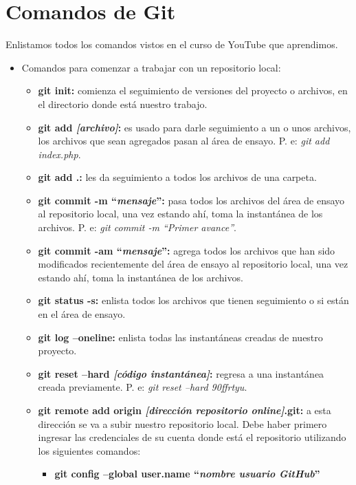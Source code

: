 \section{Comandos de Git}
\hspace{0.55cm}Enlistamos todos los comandos vistos en el curso de YouTube que aprendimos.
\begin{itemize}
    \item Comandos para comenzar a trabajar con un repositorio local:
    \begin{itemize}
        \item \textbf{git init:} comienza el seguimiento de versiones del proyecto o archivos, en el directorio donde está nuestro trabajo.
        \item \textbf{git add \textit{[archivo]}:} es usado para darle seguimiento a un o unos archivos, los archivos que sean agregados pasan al área de ensayo. P. e: \textit{git add index.php}.
        \item \textbf{git add .: }les da seguimiento a todos los archivos de una carpeta.
        \item \textbf{git commit -m “\textit{mensaje}”:} pasa todos los archivos del área de ensayo al repositorio local, una vez estando ahí, toma la instantánea de los archivos. P. e: \textit{git commit -m “Primer avance”}.
        \item \textbf{git commit -am “\textit{mensaje}”:} agrega todos los archivos que han sido modificados recientemente del área de ensayo al repositorio local, una vez estando ahí, toma la instantánea de los archivos.
        \item \textbf{git status -s: }enlista todos los archivos que tienen seguimiento o si están en el área de ensayo.
        \item \textbf{git log –oneline: }enlista todas las instantáneas creadas de nuestro proyecto.
        \item \textbf{git reset –hard \textit{[código instantánea]}:} regresa a una instantánea creada previamente. P. e: \textit{git reset –hard 90ffrtyu}.
        \item \textbf{git remote add origin \textit{[dirección repositorio online]}.git:} a esta dirección se va a subir nuestro repositorio local. Debe haber primero ingresar las credenciales de su cuenta donde está el repositorio utilizando los siguientes comandos:
        \begin{itemize}
            \item \textbf{git config –global user.name “\textit{nombre usuario GitHub}”}

\end{itemize}
\end{itemize}
\end{itemize}

